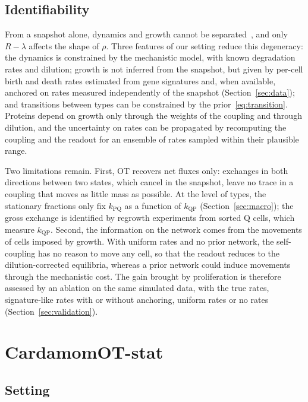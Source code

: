 \documentclass[a4paper, 11pt]{article}
\newcommand{\cP}{\mathrm{P}}
\newcommand{\cQ}{\mathrm{Q}}
\theoremstyle{plain}
\theoremstyle{remark}
\begin{document}
\subsection{Identifiability}\label{sec:ident}

From a snapshot alone, dynamics and growth cannot be separated~\cite{weinreb2018fundamental}, and only $R - \lambda$ affects the shape of $\rho$. Three features of our setting reduce this degeneracy: the dynamics is constrained by the mechanistic model, with known degradation rates and dilution; growth is not inferred from the snapshot, but given by per-cell birth and death rates estimated from gene signatures and, when available, anchored on rates measured independently of the snapshot (Section~\ref{sec:data}); and transitions between types can be constrained by the prior~\eqref{eq:transition}. Proteins depend on growth only through the weights of the coupling and through dilution, and the uncertainty on rates can be propagated by recomputing the coupling and the readout for an ensemble of rates sampled within their plausible range.

Two limitations remain. First, OT recovers net fluxes only: exchanges in both directions between two states, which cancel in the snapshot, leave no trace in a coupling that moves as little mass as possible. At the level of types, the stationary fractions only fix $k_{\cP\cQ}$ as a function of $k_{\cQ\cP}$ (Section~\ref{sec:macro}); the gross exchange is identified by regrowth experiments from sorted $\cQ$ cells, which measure $k_{\cQ\cP}$. Second, the information on the network comes from the movements of cells imposed by growth. With uniform rates and no prior network, the self-coupling has no reason to move any cell, so that the readout reduces to the dilution-corrected equilibria, whereas a prior network could induce movements through the mechanistic cost. The gain brought by proliferation is therefore assessed by an ablation on the same simulated data, with the true rates, signature-like rates with or without anchoring, uniform rates or no rates (Section~\ref{sec:validation}).

\section{CardamomOT-stat}\label{sec:stat}

\subsection{Setting}
\end{document}
